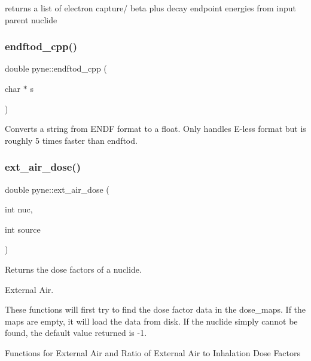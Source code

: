 returns a list of electron capture/ beta plus decay endpoint energies from input parent nuclide \mbox{\label{namespacepyne_a45f290823266c99c35b7b84516087de0}} 
\subsubsection{\texorpdfstring{endftod\+\_\+cpp()}{endftod\_cpp()}}
{\footnotesize\ttfamily double pyne\+::endftod\+\_\+cpp (\begin{DoxyParamCaption}\item[{char $\ast$}]{s }\end{DoxyParamCaption})}

Converts a string from E\+N\+DF format to a float. Only handles E-\/less format but is roughly 5 times faster than endftod. \mbox{\label{namespacepyne_a01d3b4d7c1486b00dc025800d010f3c0}} 
\subsubsection{\texorpdfstring{ext\+\_\+air\+\_\+dose()}{ext\_air\_dose()}}
{\footnotesize\ttfamily double pyne\+::ext\+\_\+air\+\_\+dose (\begin{DoxyParamCaption}\item[{int}]{nuc,  }\item[{int}]{source }\end{DoxyParamCaption})}



Returns the dose factors of a nuclide. 

External Air.

These functions will first try to find the dose factor data in the dose\+\_\+maps. If the maps are empty, it will load the data from disk. If the nuclide simply cannot be found, the default value returned is -\/1.

Functions for External Air and Ratio of External Air to Inhalation Dose Factors \mbox{\label{namespacepyne_a09838b0682aec7c3b6b5d79ab95ed743}} 
